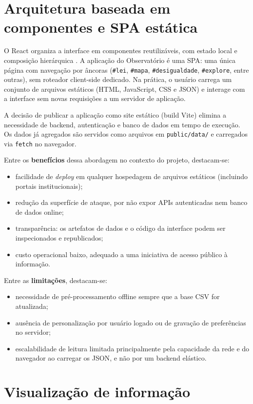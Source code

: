 \section{Arquitetura baseada em componentes e SPA estática}

O React organiza a interface em componentes reutilizáveis, com estado local e composição hierárquica \cite{react_docs}. A aplicação do Observatório é uma \acs{SPA}: uma única página com navegação por âncoras (\texttt{\#lei}, \texttt{\#mapa}, \texttt{\#desigualdade}, \texttt{\#explore}, entre outras), sem roteador client-side dedicado. Na prática, o usuário carrega um conjunto de arquivos estáticos (HTML, JavaScript, CSS e \acs{JSON}) e interage com a interface sem novas requisições a um servidor de aplicação.

A decisão de publicar a aplicação como site estático (build Vite) elimina a necessidade de backend, autenticação e banco de dados em tempo de execução. Os dados já agregados são servidos como arquivos em \texttt{public/data/} e carregados via \texttt{fetch} no navegador.

Entre os \textbf{benefícios} dessa abordagem no contexto do projeto, destacam-se:
\begin{itemize}
	\item facilidade de \textit{deploy} em qualquer hospedagem de arquivos estáticos (incluindo portais institucionais);
	\item redução da superfície de ataque, por não expor APIs autenticadas nem banco de dados online;
	\item transparência: os artefatos de dados e o código da interface podem ser inspecionados e republicados;
	\item custo operacional baixo, adequado a uma iniciativa de acesso público à informação.
\end{itemize}

Entre as \textbf{limitações}, destacam-se:
\begin{itemize}
	\item necessidade de pré-processamento offline sempre que a base \acs{CSV} for atualizada;
	\item ausência de personalização por usuário logado ou de gravação de preferências no servidor;
	\item escalabilidade de leitura limitada principalmente pela capacidade da rede e do navegador ao carregar os \acs{JSON}, e não por um backend elástico.
\end{itemize}

\section{Visualização de informação}

